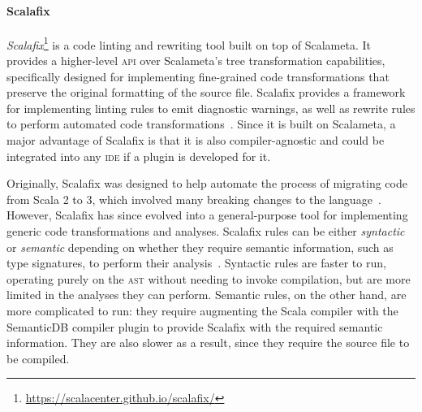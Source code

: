 \documentclass[../../main.tex]{subfiles}
\begin{document}
\paragraph{Scalafix}
\textit{Scalafix}\footnote{\url{https://scalacenter.github.io/scalafix/}} is a code linting and rewriting tool built on top of Scalameta.
It provides a higher-level \textsc{api} over Scalameta's tree transformation capabilities, specifically designed for implementing fine-grained code transformations that preserve the original formatting of the source file.
Scalafix provides a framework for implementing linting rules to emit diagnostic warnings, as well as rewrite rules to perform automated code transformations~\cite{geirsson_catch_2017}.
Since it is built on Scalameta, a major advantage of Scalafix is that it is also compiler-agnostic and could be integrated into any \textsc{ide} if a plugin is developed for it.

Originally, Scalafix was designed to help automate the process of migrating code from Scala 2 to 3, which involved many breaking changes to the language~\cite{geirsson_scalafix_2016}.
However, Scalafix has since evolved into a general-purpose tool for implementing generic code transformations and analyses.
Scalafix rules can be either \emph{syntactic} or \emph{semantic} depending on whether they require semantic information, such as type signatures, to perform their analysis~\cite{scalacenter_scalafix_2024}.
Syntactic rules are faster to run, operating purely on the \textsc{ast} without needing to invoke compilation, but are more limited in the analyses they can perform.
Semantic rules, on the other hand, are more complicated to run: they require augmenting the Scala compiler with the SemanticDB compiler plugin to provide Scalafix with the required semantic information.
They are also slower as a result, since they require the source file to be compiled.

\end{document}
